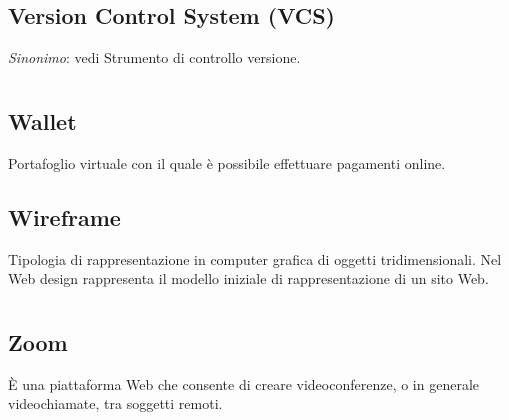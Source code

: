 	\subsection*{Version Control System (VCS)}
	\textit{Sinonimo}: vedi Strumento di controllo versione.
\pagebreak
\section{}
	\subsection*{Wallet}
	Portafoglio virtuale con il quale è possibile effettuare pagamenti online.
	\subsection*{Wireframe}
	Tipologia di rappresentazione in computer grafica di oggetti tridimensionali. Nel Web design rappresenta il modello iniziale di rappresentazione di un sito Web.
\pagebreak
\section{}
	\subsection*{Zoom}
	È una piattaforma Web che consente di creare videoconferenze, o in generale videochiamate, tra soggetti remoti.

